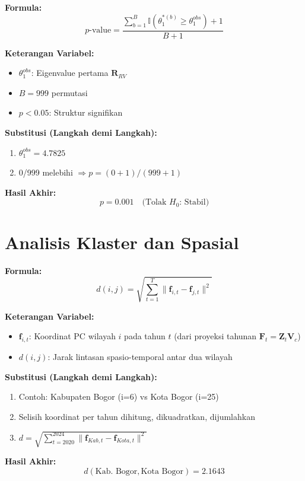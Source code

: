 \documentclass[11pt,a4paper]{article}
\begin{document}
\begin{tcolorbox}[formula_box, title={29. Uji Permutasi Stabilitas}]
\textbf{Formula:}
\[p\text{-value}=\frac{\sum_{b=1}^B\mathbb{I}(\theta_1^{*(b)}\geq\theta_1^{obs})+1}{B+1}\]

\textbf{Keterangan Variabel:}
\begin{itemize}
  \item $\theta_1^{obs}$: Eigenvalue pertama $\mathbf{R}_{RV}$
  \item $B=999$ permutasi
  \item $p<0.05$: Struktur signifikan
\end{itemize}

\textbf{Substitusi (Langkah demi Langkah):}
\begin{enumerate}
  \item $\theta_1^{obs}=4.7825$
  \item 0/999 melebihi $\Rightarrow p=(0+1)/(999+1)$
\end{enumerate}

\textbf{Hasil Akhir:}
\[ p=0.001 \quad \text{(Tolak $H_0$: Stabil)} \]
\end{tcolorbox}


\section{Analisis Klaster dan Spasial}
\begin{tcolorbox}[formula_box, title={18. Jarak Euclidean antar Trajektori}]
\textbf{Formula:}
\[ d(i,j) = \sqrt{\sum_{t=1}^{T} \|\mathbf{f}_{i,t} - \mathbf{f}_{j,t}\|^2} \]

\textbf{Keterangan Variabel:}
\begin{itemize}
  \item $\mathbf{f}_{i,t}$: Koordinat PC wilayah $i$ pada tahun $t$ (dari proyeksi tahunan $\mathbf{F}_t = \mathbf{Z}_t \mathbf{V}_c$)
  \item $d(i,j)$: Jarak lintasan spasio-temporal antar dua wilayah
\end{itemize}

\textbf{Substitusi (Langkah demi Langkah):}
\begin{enumerate}
  \item Contoh: Kabupaten Bogor (i=6) vs Kota Bogor (i=25)
  \item Selisih koordinat per tahun dihitung, dikuadratkan, dijumlahkan
  \item $d = \sqrt{\sum_{t=2020}^{2024} \|\mathbf{f}_{Kab,t} - \mathbf{f}_{Kota,t}\|^2}$
\end{enumerate}

\textbf{Hasil Akhir:}
\[ d(\text{Kab.\ Bogor},\text{Kota Bogor}) = 2.1643 \]
\end{tcolorbox}
\end{document}
